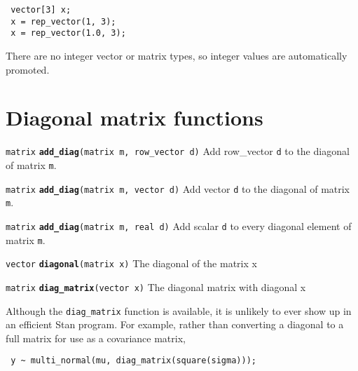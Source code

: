 \documentclass[
  10pt,
]{book}
\begin{document}
\begin{verbatim}
 vector[3] x;
 x = rep_vector(1, 3);
 x = rep_vector(1.0, 3);
\end{verbatim}

There are no integer vector or matrix types, so integer values are
automatically promoted.

\hypertarget{diagonal-matrix-functions}{%
\section{Diagonal matrix functions}\label{diagonal-matrix-functions}}


\texttt{matrix} \textbf{\texttt{add\_diag}}\texttt{(matrix\ m,\ row\_vector\ d)}\newline
Add row\_vector \texttt{d} to the diagonal of matrix \texttt{m}.


\texttt{matrix} \textbf{\texttt{add\_diag}}\texttt{(matrix\ m,\ vector\ d)}\newline
Add vector \texttt{d} to the diagonal of matrix \texttt{m}.


\texttt{matrix} \textbf{\texttt{add\_diag}}\texttt{(matrix\ m,\ real\ d)}\newline
Add scalar \texttt{d} to every diagonal element of matrix \texttt{m}.


\texttt{vector} \textbf{\texttt{diagonal}}\texttt{(matrix\ x)}\newline
The diagonal of the matrix x


\texttt{matrix} \textbf{\texttt{diag\_matrix}}\texttt{(vector\ x)}\newline
The diagonal matrix with diagonal x

Although the \texttt{diag\_matrix} function is available, it is unlikely to
ever show up in an efficient Stan program. For example, rather than
converting a diagonal to a full matrix for use as a covariance matrix,

\begin{verbatim}
 y ~ multi_normal(mu, diag_matrix(square(sigma)));
\end{verbatim}
\end{document}
